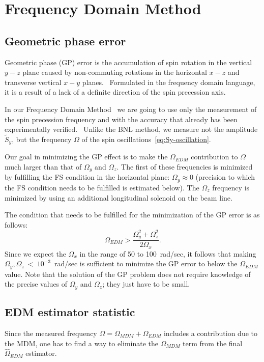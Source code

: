 \documentclass[a4paper]{jpconf}
\newcommand{\W}{\Omega}
\begin{document}
\section{Frequency Domain Method}
\subsection{Geometric phase error}
Geometric phase (GP) error is the accumulation of spin rotation in the vertical $y-z$ plane caused by non-commuting rotations in the horizontal $x-z$ and transverse vertical $x-y$ planes.~\cite[p.~23]{AGS-proposal-deuteron} Formulated in the frequency domain language, it is a result of a lack of a definite direction of the spin precession axis. 

In our Frequency Domain Method~\cite{Senichev:FDM} we are going to use only the measurement of the spin precession frequency and with the accuracy that already has been experimentally verified.~\cite{Bagdasarian} Unlike the BNL method, we measure not the amplitude $\tilde S_y$, but the frequency $\W$ of the spin oscillations~\eqref{eq:Sy-oscillation}.

Our goal in minimizing the GP effect is to make the $\W_{EDM}$ contribution to $\W$ much larger than that of $\W_y$ and $\W_z$. The first of these frequencies is minimized by fulfilling the FS condition in the horizontal plane: $\W_y\approx0$ (precision to which the FS condition needs to be fulfilled is estimated below). The $\W_z$ frequency is minimized by using an additional longitudinal solenoid on the beam line. 

The condition that needs to be fulfilled for the minimization of the GP error is as follows:~\cite[p.~4]{Senichev:FDM}
\begin{equation}\label{eq:GP-minimization-condition}
\W_{EDM} > \frac{\W_y^2 + \W_z^2}{2\W_x}.
\end{equation}
Since we expect the $\W_x$ in the range of 50 to 100~rad/sec, it follows that making $\W_y,\W_z~<~10^{-3}$~rad/sec is sufficient to minimize the GP error to below the $\W_{EDM}$ value. Note that the solution of the GP problem does not require knowledge of the precise values of $\W_y$ and $\W_z$; they just have to be small.

\subsection{EDM estimator statistic}
Since the measured frequency $\W = \W_{MDM} + \W_{EDM}$ includes a contribution due to the MDM, one has to find a way to eliminate the $\W_{MDM}$ term from the final $\hat\W_{EDM}$ estimator. 
\end{document}
